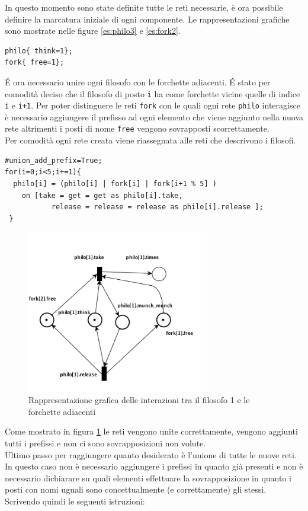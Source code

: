 \documentclass[italian,12pt]{book}
\begin{document}
In questo momento sono state definite tutte le reti necessarie, è ora possibile definire la marcatura iniziale
di ogni componente. Le rappresentazioni grafiche sono mostrate nelle figure \ref{es:philo3} e \ref{es:fork2}.

\begin{verbatim}philo{ think=1};
fork{ free=1};
\end{verbatim}

\'E ora necessario unire ogni filosofo con le forchette adiacenti. \'E stato per comodità deciso che 
il filosofo di posto {\tt i} ha come forchette vicine quelle di indice {\tt i} e {\tt i+1}. Per poter distinguere 
le reti {\tt fork} con le quali ogni rete {\tt philo} interagisce è necessario aggiungere il prefisso ad 
ogni elemento che viene aggiunto nella nuova rete altrimenti i posti di nome {\tt free} vengono sovrapposti 
scorrettamente. \\
Per comodità ogni rete creata viene riassegnata alle reti che descrivono i filosofi.

\begin{verbatim}#union_add_prefix=True;
for(i=0;i<5;i+=1){
  philo[i] = (philo[i] | fork[i] | fork[i+1 % 5] ) 
  	on [take = get = get as philo[i].take,
	       release = release = release as philo[i].release ];
 }
 \end{verbatim}

\begin{figure}[htb]
\centerline{\includegraphics[width=8cm]{img/philo_con_fork.png}}
\caption{Rappresentazione grafica delle interazioni tra il filosofo 1 e le forchette adiacenti}\label{es:philo_con_fork}
\end{figure}


Come mostrato in figura \ref{es:philo_con_fork} le reti vengono unite correttamente, vengono aggiunti tutti
i prefissi e non ci sono sovrapposizioni non volute. \\
Ultimo passo per raggiungere quanto desiderato è l'unione di tutte le nuove reti. In questo caso 
non è necessario aggiungere i prefissi in quanto già presenti e non è necessario dichiarare su quali 
elementi effettuare la sovrapposizione in quanto i posti con nomi uguali sono concettualmente (e correttamente) gli stessi. \\
Scrivendo quindi le seguenti istruzioni:
\end{document}
